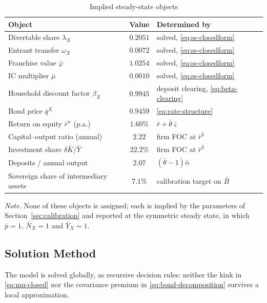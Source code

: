\begin{table}[t]
\centering
\caption{Implied steady-state objects}
\label{tab:ss-implied}
\begin{tabular}{lcl}
\hline\hline
Object & Value & Determined by \\
\hline
Divertable share $\lambda_X$              & $0.2051$ & solved, \eqref{eq:ss-closedform} \\
Entrant transfer $\omega_X$               & $0.0072$ & solved, \eqref{eq:ss-closedform} \\
Franchise value $\bar\varphi$             & $1.0254$ & solved, \eqref{eq:ss-closedform} \\
IC multiplier $\bar\mu$                   & $0.0010$ & solved, \eqref{eq:ss-closedform} \\
Household discount factor $\beta_X$       & $0.9945$ & deposit clearing, \eqref{eq:beta-clearing} \\
Bond price $\bar q^{X}$                   & $0.9459$ & \eqref{eq:rate-structure} \\
Return on equity $\bar r^{n}$ (p.a.)      & $1.60\%$ & $\bar r+\bar\theta\bar\varsigma$ \\
Capital--output ratio (annual)            & $2.22$   & firm FOC at $\bar r^{k}$ \\
Investment share $\delta\bar K/\bar Y$    & $22.2\%$ & firm FOC at $\bar r^{k}$ \\
Deposits / annual output                  & $2.07$   & $(\bar\theta-1)\bar n$ \\
Sovereign share of intermediary assets    & $7.1\%$  & calibration target on $\bar B$ \\
\hline\hline
\end{tabular}

\smallskip
\begin{minipage}{0.92\textwidth}
\footnotesize \emph{Note.} None of these objects is assigned; each is implied by
the parameters of Section~\ref{sec:calibration} and reported at the symmetric
steady state, in which $\bar p=1$, $\bar N_X=1$ and $\bar Y_X=1$.
\end{minipage}
\end{table}

\subsection{Solution Method}
\label{sec:solution}

The model is solved globally, as recursive decision rules: neither the kink in
\eqref{eq:mu-closed} nor the covariance premium in
\eqref{eq:bond-decomposition} survives a local approximation.

